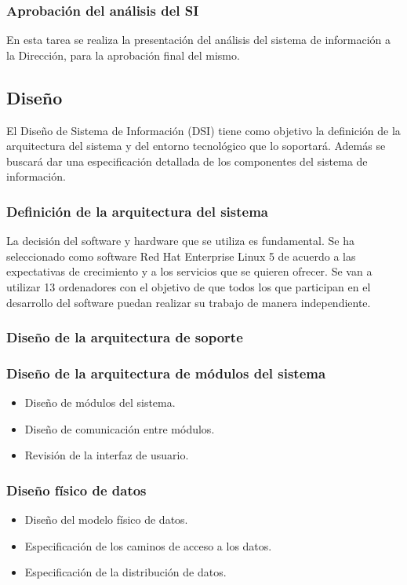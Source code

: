 \documentclass[11pt,a4paper,spanish,twoside]{book}
\begin{document}
\subsubsection{Aprobación del análisis del SI}
En esta tarea se realiza la presentación del análisis del sistema de
información a la Dirección, para la aprobación final del mismo.

\subsection{Diseño}
El Diseño de Sistema de Información (DSI) tiene como objetivo la definición
de la arquitectura del sistema y del entorno tecnológico que lo soportará. 
Además se buscará dar una especificación detallada de los componentes del 
sistema de información.

\subsubsection{Definición de la arquitectura del sistema}
La decisión del software y hardware que se utiliza es fundamental. Se ha
seleccionado como software Red Hat Enterprise Linux 5 de acuerdo a las
expectativas de crecimiento y a los servicios que se quieren ofrecer. Se
van a utilizar 13 ordenadores con el objetivo de que todos los que participan
en el desarrollo del software puedan realizar su trabajo de manera 
independiente. 
 
\subsubsection{Diseño de la arquitectura de soporte}

\subsubsection{Diseño de la arquitectura de módulos del sistema}
    \begin{itemize}
    \item Diseño de módulos del sistema.
    \item Diseño de comunicación entre módulos.
    \item Revisión de la interfaz de usuario.
    \end{itemize}
\subsubsection{Diseño físico de datos}
    \begin{itemize}
    \item Diseño del modelo físico de datos.
    \item Especificación de los caminos de acceso a los datos.
    \item Especificación de la distribución de datos.
    \end{itemize}
\end{document}
